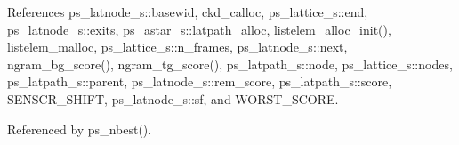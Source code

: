 References ps\-\_\-latnode\-\_\-s\-::basewid, ckd\-\_\-calloc, ps\-\_\-lattice\-\_\-s\-::end, ps\-\_\-latnode\-\_\-s\-::exits, ps\-\_\-astar\-\_\-s\-::latpath\-\_\-alloc, listelem\-\_\-alloc\-\_\-init(), listelem\-\_\-malloc, ps\-\_\-lattice\-\_\-s\-::n\-\_\-frames, ps\-\_\-latnode\-\_\-s\-::next, ngram\-\_\-bg\-\_\-score(), ngram\-\_\-tg\-\_\-score(), ps\-\_\-latpath\-\_\-s\-::node, ps\-\_\-lattice\-\_\-s\-::nodes, ps\-\_\-latpath\-\_\-s\-::parent, ps\-\_\-latnode\-\_\-s\-::rem\-\_\-score, ps\-\_\-latpath\-\_\-s\-::score, S\-E\-N\-S\-C\-R\-\_\-\-S\-H\-I\-F\-T, ps\-\_\-latnode\-\_\-s\-::sf, and W\-O\-R\-S\-T\-\_\-\-S\-C\-O\-R\-E.



Referenced by ps\-\_\-nbest().

